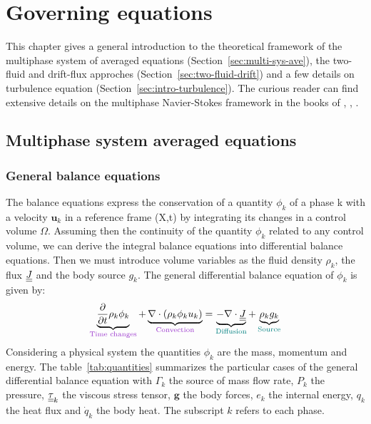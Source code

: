 \chapter{Governing equations}

This chapter gives a general introduction to the theoretical framework of the multiphase system of averaged equations (Section~\ref{sec:multi-sys-ave}), the two-fluid and drift-flux approches (Section~\ref{sec:two-fluid-drift}) and a few details on turbulence equation (Section~\ref{sec:intro-turbulence}). The curious reader can find extensive details on the multiphase Navier-Stokes framework in the books of \textcite{LivreIH}, \textcite{Morel2015}, \textcite{LivreDrewPassman}. 

\section{Multiphase system averaged equations\label{sec:multi-sys-ave}}

\subsection{General balance equations}

The balance equations express the conservation of a quantity $\phi_k$ of a phase k with a velocity $\mathbf{u}_k$ in a reference frame (X,t) by integrating its changes in a control volume $\Omega$. Assuming then the continuity of the quantity $\phi_k$ related to any control volume, we can derive the integral balance equations into differential balance equations. Then we must introduce volume variables as the fluid density $\rho_k$, the flux $\underline{\underline{J}}$ and the body source $g_k$. The general differential balance equation of $\phi_k$ is given by: 
\begin{equation}\label{base:everything}
    \underbrace{\frac{\partial}{\partial t}\rho_k\phi_k}_{\color{mydarkorchid}\text{Time changes}}+\underbrace{\nabla\cdot\parent{\rho_k\phi_ku_k}}_{\color{mydarkorchid} \text{Convection}}=\underbrace{-\nabla\cdot\ull{J}}_{\color{myteal}\text{Diffusion}}+\underbrace{\rho_k g_k}_{\color{myteal}\text{Source}}
\end{equation}
Considering a physical system the quantities $\phi_k$ are the mass, momentum and energy. The table~\ref{tab:quantities} summarizes the particular cases of the general differential balance equation with $\Gamma_k$ the source of mass flow rate, $P_k$ the pressure, $\underline{\underline{\tau}}_k$ the viscous stress tensor, $\mathbf{g}$ the body forces, $e_k$ the internal energy, $q_k$ the heat flux and $\dot{q}_k$ the body heat. The subscript $k$ refers to each phase.



